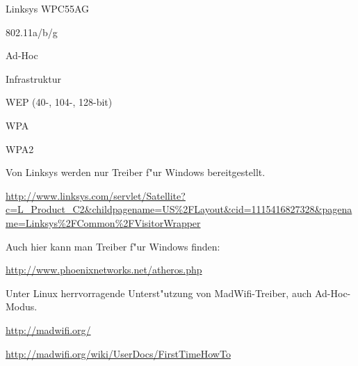 %
%
\begin{wlandevice}{Linksys WPC55AG}



\begin{wlanieeestandard}
\item 802.11a/b/g
\end{wlanieeestandard}

\begin{wlanmode}
\item Ad-Hoc
\item Infrastruktur
\end{wlanmode}

\begin{wlansecurity}
\item WEP (40-, 104-, 128-bit)
\item WPA
\item WPA2
\end{wlansecurity}

\begin{wlandriver}
\item
Von Linksys werden nur Treiber f"ur Windows bereitgestellt.

\url{http://www.linksys.com/servlet/Satellite?c=L_Product_C2&childpagename=US\%2FLayout&cid=1115416827328&pagename=Linksys\%2FCommon\%2FVisitorWrapper}

Auch hier kann man Treiber f"ur Windows finden:

\url{http://www.phoenixnetworks.net/atheros.php}

Unter Linux herrvorragende Unterst"utzung von MadWifi-Treiber,
auch Ad-Hoc-Modus.

\url{http://madwifi.org/}
\end{wlandriver}


\begin{wlaninstall}
\item
\url{http://madwifi.org/wiki/UserDocs/FirstTimeHowTo}
\end{wlaninstall}


\end{wlandevice}
